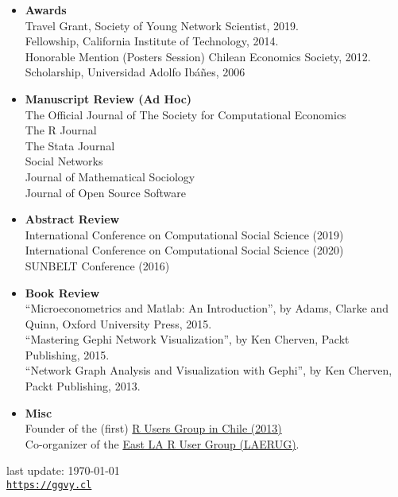 \documentclass[letterpaper, 12pt]{article}
\def\footerlink{https://ggvy.cl}
\begin{document}
\begin{itemize}
\item[] \textbf{Awards}\\
Travel Grant, Society of Young Network Scientist, 2019.\\
Fellowship, California Institute of Technology, 2014.\\
Honorable Mention (Posters Session) Chilean Economics Society, 2012.\\
Scholarship, Universidad Adolfo Ib\'a\~nes, 2006
\item[] \textbf{Manuscript Review (Ad Hoc)} \\
The Official Journal of The Society for Computational Economics\\
The R Journal\\
The Stata Journal\\
Social Networks\\
Journal of Mathematical Sociology\\
Journal of Open Source Software
\item[] \textbf{Abstract Review} \\
International Conference on Computational Social Science (2019)\\
International Conference on Computational Social Science (2020)\\
SUNBELT Conference (2016)
\item[] \textbf{Book Review}\\
``Microeconometrics and Matlab: An Introduction'', by Adams, Clarke and Quinn, Oxford University Press, 2015.\\
``Mastering Gephi Network Visualization'', by Ken Cherven, Packt Publishing, 2015.\\
``Network Graph Analysis and Visualization with Gephi'', by Ken Cherven, Packt Publishing, 2013.

\item[] \textbf{Misc}\\
Founder of the (first) \href{https://www.meetup.com/useRchile/}{R Users Group in Chile (2013)}\\
Co-organizer of the \href{https://socalr.org}{East LA R User Group (LAERUG)}.
\end{itemize}

\bigskip

\begin{center}
 \begin{footnotesize}
   last update: \today \\
   \href{\footerlink}{\texttt{\footerlink}}
 \end{footnotesize}
\end{center}
\end{document}
